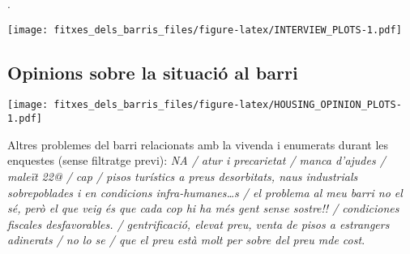 \documentclass[]{article}
\begin{document}
.

\texttt{[image: fitxes\_dels\_barris\_files/figure-latex/INTERVIEW\_PLOTS-1.pdf]}

\subsection{Opinions sobre la situació al
barri}\label{opinions-sobre-la-situacio-al-barri}

\texttt{[image: fitxes\_dels\_barris\_files/figure-latex/HOUSING\_OPINION\_PLOTS-1.pdf]}

Altres problemes del barri relacionats amb la vivenda i enumerats durant
les enquestes (sense filtratge previ): \emph{NA / atur i precarietat /
manca d'ajudes / maleït 22@ / cap / pisos turístics a preus desorbitats,
naus industrials sobrepoblades i en condicions infra-humanes\ldots{}s /
el problema al meu barri no el sé, però el que veig és que cada cop hi
ha més gent sense sostre!! / condiciones fiscales desfavorables. /
gentrificació, elevat preu, venta de pisos a estrangers adinerats / no
lo se / que el preu està molt per sobre del preu mde cost}.
\end{document}
